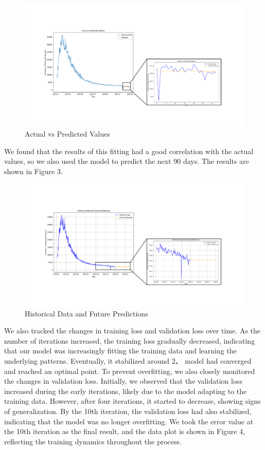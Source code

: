 \documentclass{mcmthesis}  %
\begin{document}
\begin{figure}[h]  %
        \small
        \centering  %
        \includegraphics[width=12cm]{figure/F2.pdf}  %
        \caption{Actual vs Predicted Values} \label{Figure2}  %
\end{figure}  %
We found that the results of this 
fitting had a good correlation with the actual values, so we also used the model to predict the next 90 days. 
The results are shown in Figure 3.
\begin{figure}[h]  %
        \small
        \centering  %
        \includegraphics[width=12cm]{figure/F3.pdf}  %
        \caption{Historical Data and Future Predictions} \label{Figure2}  %
\end{figure}  %


We also tracked the changes in training loss and validation loss over time. As the number of iterations increased, 
the training loss gradually decreased, indicating that our model was increasingly fitting the training data and 
learning the underlying patterns. Eventually, it stabilized around 2、%
model had converged and reached an optimal point. To prevent overfitting, we also closely monitored the changes 
in validation loss. Initially, we observed that the validation loss increased during the early iterations, likely 
due to the model adapting to the training data. However, after four iterations, it started to decrease, showing 
signs of generalization. By the 10th iteration, the validation loss had also stabilized, indicating that the model 
was no longer overfitting. We took the error value at the 10th iteration as the final result, and the data plot is 
shown in Figure 4, reflecting the training dynamics throughout the process.
\end{document}
